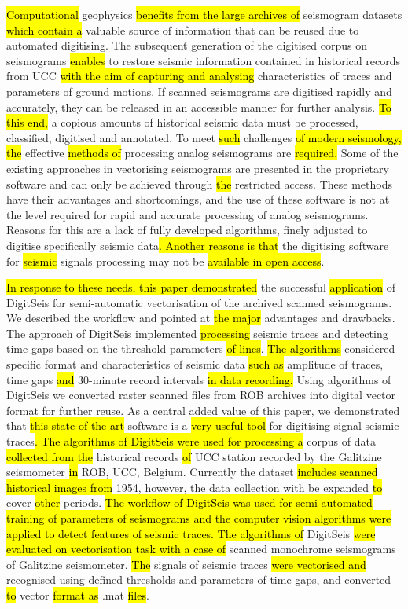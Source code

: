 \documentclass[sensors,article,submit,moreauthors,pdftex]{Definitions/mdpi}
\begin{document}
\hl{Computational} geophysics \hl{benefits from the large archives of }seismogram datasets \hl{which contain a }valuable source of information that can be reused due to automated digitising. The subsequent generation of the digitised corpus on seismograms\hl{ enables }to restore seismic information contained in historical records from \ac{UCC} \hl{with the aim of capturing and analysing} characteristics of traces and parameters of ground motions. If scanned seismograms are digitised rapidly and accurately, they can be released in an accessible manner for further analysis. \hl{To this end, }a copious amounts of historical seismic data must be processed, classified, digitised and annotated. To meet\hl{ such }challenges \hl{of modern seismology, the }effective \hl{methods of }processing analog seismograms are\hl{ required. }Some of the existing approaches in vectorising seismograms are presented in the proprietary software and can only be achieved through \hl{the }restricted access. These methods have their advantages and shortcomings, and the use of these software is not at the level required for rapid and accurate processing of analog seismograms. Reasons for this are a lack of fully developed\hl{ }algorithms, finely adjusted to digitise specifically seismic data\hl{. Another reasons is that }the\hl{ }digitising software for \hl{seismic }signals processing may not be \hl{available in open access}. 

\hl{In response to these needs, this paper demonstrated }the successful \hl{application } of DigitSeis for semi-automatic vectorisation of the archived scanned seismograms. We described the workflow and pointed at \hl{the major }advantages and drawbacks. The approach of DigitSeis implemented\hl{ processing }seismic traces and detecting time gaps based on the threshold parameters\hl{ of lines}. \hl{The algorithms }considered specific format and characteristics of seismic data\hl{ such as }amplitude of traces, time gaps\hl{ and }30-minute record intervals\hl{ in data recording. }Using algorithms of DigitSeis we converted raster scanned files from ROB archives into digital vector format for further reuse. As a central added value of this paper, we demonstrated that \hl{this  state-of-the-art} software is a \hl{very useful tool} for digitising signal seismic traces\hl{. The algorithms of DigitSeis were used for processing a }corpus of data\hl{ collected from the }historical records \hl{of }\ac{UCC} station recorded by the Galitzine seismometer \hl{ in} \ac{ROB}, \ac{UCC}, Belgium. Currently the dataset \hl{includes scanned historical images from }1954, however, the data collection with be expanded\hl{ to }cover \hl{other }periods.\hl{ The workflow of DigitSeis was used for semi-automated training of parameters of seismograms and the computer vision algorithms were applied to detect features of seismic traces. The algorithms of }DigitSeis \hl{were evaluated on vectorisation task with a case of }scanned monochrome seismograms of Galitzine seismometer.\hl{ The }signals of seismic traces \hl{were vectorised and }recognised using defined thresholds and parameters of time gaps, and\hl{ }converted \hl{to }vector\hl{ format as }.mat \hl{files}. 
\end{document}
